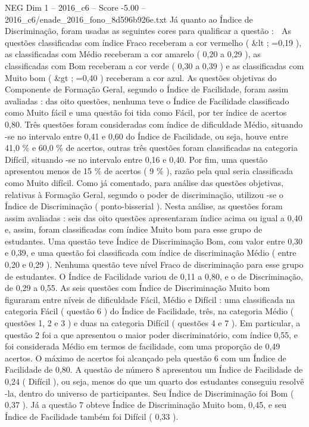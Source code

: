 \begin{textsample}{NEG Dim 1 – 2016\_c6 – Score -5.00 – 2016\_c6/enade\_2016\_fono\_8d596b926e.txt}
Já quanto ao Índice de Discriminação, foram usadas as seguintes cores para qualificar a questão :  As questões classificadas com índice Fraco receberam a cor vermelho ( \&lt ; =0,19 ), as classificadas com Médio receberam a cor amarelo ( 0,20 a 0,29 ), as classificadas com Bom receberam a cor verde ( 0,30 a 0,39 ) e as classificadas com Muito bom ( \&gt ; =0,40 ) receberam a cor azul.
As questões objetivas do Componente de Formação Geral, segundo o Índice de Facilidade, foram assim avaliadas : das oito questões, nenhuma teve o Índice de Facilidade classificado como Muito fácil e uma questão foi tida como Fácil, por ter índice de acertos 0,80.
Três questões foram consideradas com índice de dificuldade Médio, situando -se no intervalo entre 0,41 e 0,60 do Índice de Facilidade, ou seja, houve entre 41,0 \% e 60,0 \% de acertos, outras três questões foram classificadas na categoria Difícil, situando -se no intervalo entre 0,16 e 0,40.
Por fim, uma questão apresentou menos de 15 \% de acertos ( 9 \% ), razão pela qual seria classificada como Muito difícil.
Como já comentado, para análise das questões objetivas, relativas à Formação Geral, segundo o poder de discriminação, utilizou -se o Índice de Discriminação ( ponto-bisserial ).
Nesta análise, as questões foram assim avaliadas : seis das oito questões apresentaram índice acima ou igual a 0,40 e, assim, foram classificadas com índice Muito bom para esse grupo de estudantes.
Uma questão teve Índice de Discriminação Bom, com valor entre 0,30 e 0,39, e uma questão foi classificada com índice de discriminação Médio ( entre 0,20 e 0,29 ).
Nenhuma questão teve nível Fraco de discriminação para esse grupo de estudantes.
O Índice de Facilidade variou de 0,11 a 0,80, e o de Discriminação, de 0,29 a 0,55.
As seis questões com Índice de Discriminação Muito bom figuraram entre níveis de dificuldade Fácil, Médio e Difícil : uma classificada na categoria Fácil ( questão 6 ) do Índice de Facilidade, três, na categoria Médio ( questões 1, 2 e 3 ) e duas na categoria Difícil ( questões 4 e 7 ).
Em particular, a questão 2 foi a que apresentou o maior poder discriminatório, com índice 0,55, e foi considerada Médio em termos de facilidade, com uma proporção de 0,49 acertos.
O máximo de acertos foi alcançado pela questão 6 com um Índice de Facilidade de 0,80.
A questão de número 8 apresentou um Índice de Facilidade de 0,24 ( Difícil ), ou seja, menos do que um quarto dos estudantes conseguiu resolvê -la, dentro do universo de participantes.
Seu Índice de Discriminação foi Bom ( 0,37 ).
Já a questão 7 obteve Índice de Discriminação Muito bom, 0,45, e seu Índice de Facilidade também foi Difícil ( 0,33 ).

\end{textsample}
